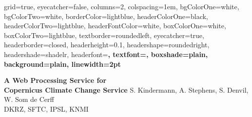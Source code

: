 \documentclass[portrait,a0paper]{baposter}
\begin{document}


\begin{poster}%
  {
  grid=true,
  eyecatcher=false,
  columns=2,
  colspacing=1em,
  bgColorOne=white,
  bgColorTwo=white,
  borderColor=lightblue,
  headerColorOne=black,
  headerColorTwo=lightblue,
  headerFontColor=white,
  boxColorOne=white,
  boxColorTwo=lightblue,
  textborder=roundedleft,
  eyecatcher=true,
  headerborder=closed,
  headerheight=0.1\textheight,
  headershape=roundedright,
  headershade=shadelr,
  headerfont=\Large\bf\textsc, %
  textfont={\setlength{\parindent}{1.5em}},
  boxshade=plain,
  background=plain,
  linewidth=2pt
  }
  {

  }
  {\sf\bf
          A Web Processing Service for\\ Copernicus Climate Change Service
  }
  {
    \vspace{1em} S. Kindermann, A. Stephens, S. Denvil, W. Som de Cerff\\
    {\smaller DKRZ, SFTC, IPSL, KNMI}
  }
  {

  }



\end{poster}
\end{document}
